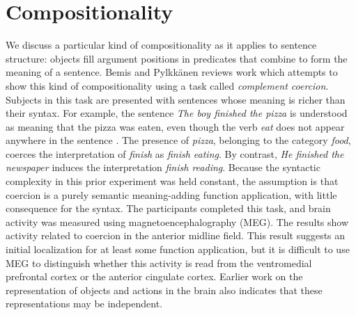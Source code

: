 \section{Compositionality}
\label{sec:compositionality}

We discuss a particular kind of compositionality as it applies to sentence
structure: objects fill argument positions in predicates that combine to form
the meaning of a sentence.
%
Bemis and Pylkk{\"{a}}nen \cite{pylkkanen2011grounding} reviews work
which attempts to show this kind of compositionality using a task
called \emph{complement coercion}.
%
Subjects in this task are presented with sentences whose meaning is richer
than their syntax.
%
For example, the sentence \emph{The boy finished the pizza} is understood as
meaning that the pizza was eaten, even though the verb \emph{eat} does not
appear anywhere in the sentence \citep{pustejovsky1995}.
%
The presence of \emph{pizza}, belonging to the category \emph{food}, coerces
the interpretation of \emph{finish} as \emph{finish eating}.
%
By contrast, \emph{He finished the newspaper} induces the interpretation
\emph{finish reading}.
%
Because the syntactic complexity in this prior experiment was held constant, the
assumption is that coercion is a purely semantic meaning-adding function
application, with little consequence for the syntax.
%
The participants completed this task, and brain activity was measured using
magnetoencephalography (MEG).
%
The results show activity related to coercion in the anterior midline field.
%
This result suggests an initial localization for at least some function
application, but it is difficult to use MEG to distinguish whether this
activity is read from the ventromedial prefrontal cortex or the anterior
cingulate cortex.
%
Earlier work on the representation of objects and actions in the brain also
indicates that these representations may be independent.

